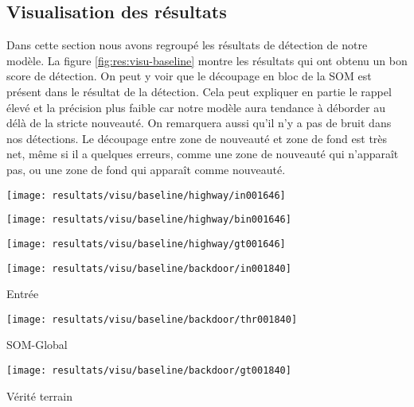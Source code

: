 	\subsection{Visualisation des résultats}
	
	Dans cette section nous avons regroupé les résultats de détection de notre modèle. La figure \ref{fig:res:visu-baseline} montre les résultats qui ont obtenu un bon score de détection. On peut y voir que le découpage en bloc de la SOM est présent dans le résultat de la détection. Cela peut expliquer en partie le rappel élevé et la précision plus faible car notre modèle aura tendance à déborder au délà de la stricte nouveauté. On remarquera aussi qu'il n'y a pas de bruit dans nos détections. Le découpage entre zone de nouveauté et zone de fond est très net, même si il a quelques erreurs, comme une zone de nouveauté qui n'apparaît pas, ou une zone de fond qui apparaît comme nouveauté.

	\begin{figureth}
		\begin{subfigureth}{.32\textwidth}
			\texttt{[image: resultats/visu/baseline/highway/in001646]}
		\end{subfigureth}
		\begin{subfigureth}{.32\textwidth}
			\texttt{[image: resultats/visu/baseline/highway/bin001646]}
		\end{subfigureth}
		\begin{subfigureth}{.32\textwidth}
			\texttt{[image: resultats/visu/baseline/highway/gt001646]}
		\end{subfigureth}

		\begin{subfigureth}{.32\textwidth}
			\texttt{[image: resultats/visu/baseline/backdoor/in001840]} \caption{Entrée}
		\end{subfigureth}
		\begin{subfigureth}{.32\textwidth}
			\texttt{[image: resultats/visu/baseline/backdoor/thr001840]} \caption{SOM-Global}
		\end{subfigureth}
		\begin{subfigureth}{.32\textwidth}
			\texttt{[image: resultats/visu/baseline/backdoor/gt001840]} \caption{Vérité terrain}
		\end{subfigureth}

		\caption[]{}\label{fig:res:visu-baseline}
	\end{figureth}

